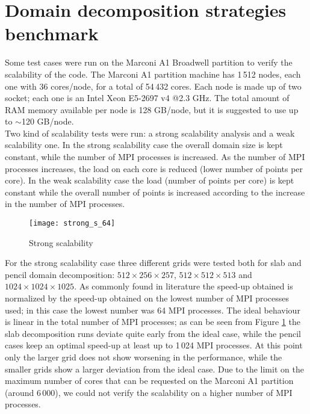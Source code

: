 \section{Domain decomposition strategies benchmark}
\label{sec: benchmark}
Some test cases were run on the Marconi A1 Broadwell partition to verify the scalability of the code. The Marconi A1 partition machine has 1\,512 nodes, each one with 36 cores/node, for a total of 54\,432 cores. Each node is made up of two socket; each one is an Intel Xeon E5-2697 v4 @2.3 GHz. The total amount of RAM memory available per node is 128 GB/node, but it is suggested to use up to $\sim$120 GB/node.\\
Two kind of scalability tests were run: a strong scalability analysis and a weak scalability one. In the strong scalability case the overall domain size is kept constant, while the number of MPI processes is increased. As the number of MPI processes increases, the load on each core is reduced (lower number of points per core). In the weak scalability case the load (number of points per core) is kept constant while the overall number of points is increased according to the increase in the number of MPI processes.\\
\begin{figure}[h!]
\centering
\texttt{[image: strong\_s\_64]}
\caption{Strong scalability}
\label{fig: strong_s}
\end{figure}
For the strong scalability case three different grids were tested both for slab and pencil domain decomposition: $512\times256\times257$, $512\times512\times513$ and $1024\times1024\times1025$. As commonly found in literature the speed-up obtained is normalized by the speed-up obtained on the lowest number of MPI processes used; in this case the lowest number was 64 MPI processes. The ideal behaviour is linear in the total number of MPI processes; as can be seen from Figure \ref{fig: strong_s} the slab decomposition runs deviate quite early from the ideal case, while the pencil cases keep an optimal speed-up at least up to 1\,024 MPI processes. At this point only the larger grid does not show worsening in the performance, while the smaller grids show a larger deviation from the ideal case. Due to the limit on the maximum number of cores  that can be requested on the Marconi A1 partition (around 6\,000), we could not verify the scalability on a higher number of MPI processes.\\
